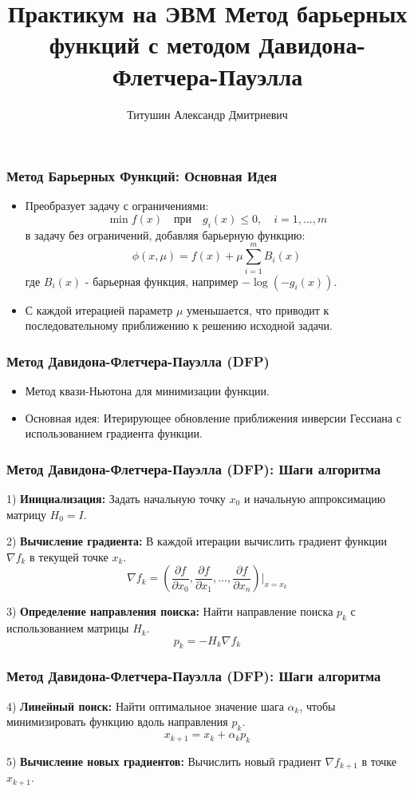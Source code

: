 \documentclass[12pt,pdf,hyperref={unicode}]{beamer}
\title{Практикум на ЭВМ Метод барьерных функций с методом Давидона-Флетчера-Пауэлла}
\author{Титушин Александр Дмитриевич}
\institute{группа 411}
\begin{document}
\newcommand\Rn{\R^n}

\frame{\maketitle}

\begin{frame}
\frametitle{Метод Барьерных Функций: Основная Идея}
\begin{itemize}
    \item Преобразует задачу с ограничениями:
    \[
    \min f(x) \quad \text{при} \quad g_i(x) \leq 0, \quad i=1,...,m
    \]
    в задачу без ограничений, добавляя барьерную функцию:
    \[
    \phi(x, \mu) = f(x) + \mu \sum_{i=1}^m B_i(x)
    \]
    где $B_i(x)$ - барьерная функция, например $-\log(-g_i(x))$.
    \item С каждой итерацией параметр $\mu$ уменьшается, что приводит к последовательному приближению к решению исходной задачи.
\end{itemize}
\end{frame}

\begin{frame}
\frametitle{Метод Давидона-Флетчера-Пауэлла (DFP)}
\begin{itemize}
    \item Метод квази-Ньютона для минимизации функции.
    \item Основная идея: Итерирующее обновление приближения инверсии Гессиана с использованием градиента функции.
\end{itemize}
\end{frame}

\begin{frame}
\frametitle{Метод Давидона-Флетчера-Пауэлла (DFP): Шаги алгоритма}
1) \textbf{Инициализация:} Задать начальную точку $x_0$ и начальную аппроксимацию матрицу $H_0 = I$.
    
2) \textbf{Вычисление градиента:} В каждой итерации вычислить градиент функции $\nabla f_k$ в текущей точке $x_k$.
    \[
    \nabla f_k = \left( \frac{\partial f}{\partial x_0}, \frac{\partial f}{\partial x_1}, \ldots, \frac{\partial f}{\partial x_n} \right) \bigg|_{x = x_k}
    \]
    
3) \textbf{Определение направления поиска:} Найти направление поиска $p_k$ с использованием матрицы $H_k$.
    \[
    p_k = -H_k \nabla f_k
    \]
\end{frame}

\begin{frame}
\frametitle{Метод Давидона-Флетчера-Пауэлла (DFP): Шаги алгоритма}
4) \textbf{Линейный поиск:} Найти оптимальное значение шага $\alpha_k$, чтобы минимизировать функцию вдоль направления $p_k$.
    \[
    x_{k+1} = x_k + \alpha_k p_k
    \]
    
5) \textbf{Вычисление новых градиентов:} Вычислить новый градиент $\nabla f_{k+1}$ в точке $x_{k+1}$.
\newline 
\end{frame}
\end{document}
